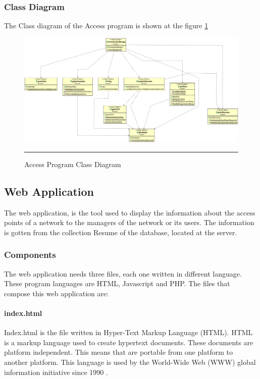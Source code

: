 \documentclass[12pt, a4paper,twoside]{tesi_upf}
\begin{document}
            \subsubsection{Class Diagram}
            
            The Class diagram of the Access program is shown at the figure \ref{fig:classdiagram}
            
             \begin{figure}[htbp]
              \centering
                  \includegraphics[scale=0.35,angle=90]{./figures/Classes.png}
                  \rule{32em}{0.5pt}
              \caption[Access Program Class Diagram]{Access Program Class Diagram}
              \label{fig:classdiagram}
            \end{figure}
            
        \subsection{Web Application}
        
        
        The web application, is the tool used to display the information about the access points of a network to the managers of the network or its users. The information is gotten from the collection Resume of the database, located at the server.
        
            \subsubsection{Components}
            The web application needs three files, each one written in different language. These program languages are HTML, Javascript and PHP.
The files that compose this web application are:
                \paragraph{index.html}
                Index.html is the file written in Hyper-Text Markup Language (HTML). HTML is a markup language used to create hypertext documents. These documents are platform independent. This means that are portable from one platform to another platform. This language is used by the World-Wide Web (WWW) global information initiative since 1990 \cite{html}.
                
\end{document}
